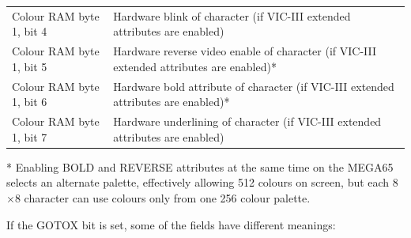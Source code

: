 \begin{longtable}{|L{3cm}|L{8cm}|}
\small Colour RAM byte 1, bit 4 & {\small Hardware blink of character (if VIC-III extended attributes are enabled) }\\
\small Colour RAM byte 1, bit 5 & {\small Hardware reverse video enable of character (if VIC-III extended attributes are enabled)* }\\
\small Colour RAM byte 1, bit 6 & {\small Hardware bold attribute of character (if VIC-III extended attributes are enabled)* }\\
\small Colour RAM byte 1, bit 7 & {\small Hardware underlining of character (if VIC-III extended attributes are enabled) }\\
\end{longtable}

* Enabling BOLD and REVERSE attributes at the same time on the MEGA65 selects an alternate palette, effectively allowing 512 colours on screen, but each 8$\times$8 character can use colours only from one 256 colour palette.

If the GOTOX bit is set, some of the fields have different meanings:

